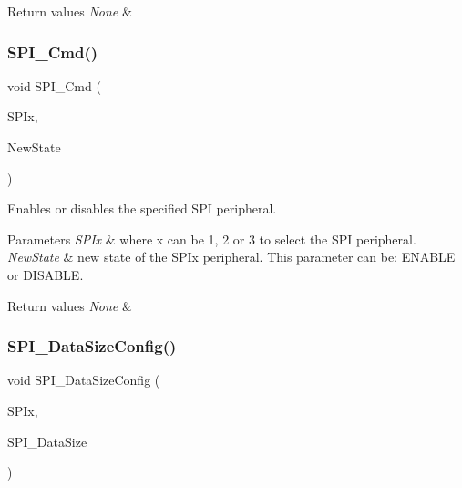 \begin{DoxyRetVals}{Return values}
{\em None} & \\
\hline
\end{DoxyRetVals}
\mbox{\label{group___s_p_i___exported___functions_gaa31357879a65ee1ed7223f3b9114dcf3}} 
\subsubsection{\texorpdfstring{SPI\_Cmd()}{SPI\_Cmd()}}
{\footnotesize\ttfamily void S\+P\+I\+\_\+\+Cmd (\begin{DoxyParamCaption}\item[{\mbox{\hyperlink{struct_s_p_i___type_def}{S\+P\+I\+\_\+\+Type\+Def}} $\ast$}]{S\+P\+Ix,  }\item[{\mbox{\hyperlink{group___exported__types_gac9a7e9a35d2513ec15c3b537aaa4fba1}{Functional\+State}}}]{New\+State }\end{DoxyParamCaption})}



Enables or disables the specified S\+PI peripheral. 


\begin{DoxyParams}{Parameters}
{\em S\+P\+Ix} & where x can be 1, 2 or 3 to select the S\+PI peripheral. \\
\hline
{\em New\+State} & new state of the S\+P\+Ix peripheral. This parameter can be\+: E\+N\+A\+B\+LE or D\+I\+S\+A\+B\+LE. \\
\hline
\end{DoxyParams}

\begin{DoxyRetVals}{Return values}
{\em None} & \\
\hline
\end{DoxyRetVals}
\mbox{\label{group___s_p_i___exported___functions_gafc82e90841d7879535d655c035709cb1}} 
\subsubsection{\texorpdfstring{SPI\_DataSizeConfig()}{SPI\_DataSizeConfig()}}
{\footnotesize\ttfamily void S\+P\+I\+\_\+\+Data\+Size\+Config (\begin{DoxyParamCaption}\item[{\mbox{\hyperlink{struct_s_p_i___type_def}{S\+P\+I\+\_\+\+Type\+Def}} $\ast$}]{S\+P\+Ix,  }\item[{uint16\+\_\+t}]{S\+P\+I\+\_\+\+Data\+Size }\end{DoxyParamCaption})}



